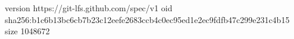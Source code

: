 version https://git-lfs.github.com/spec/v1
oid sha256:b1c6b13bc6cb7b23c12eefe2683ccb4c0ec95ed1e2ec9fdfb47c299e231c4b15
size 1048672

